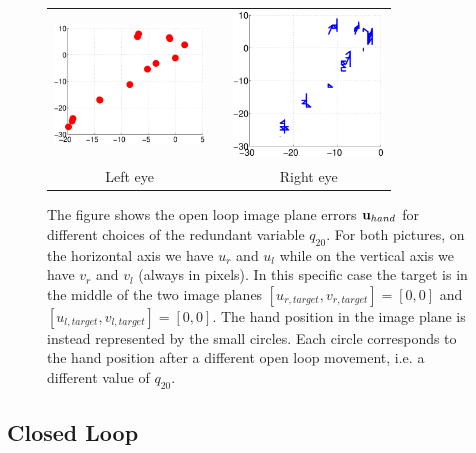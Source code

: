 \begin{figure}
  \begin{center}
	\begin{tabular}{ccc}
	  \parbox{40mm}{\includegraphics[width=40mm]{Figure/LeftEyeOpenLoop.eps}}  & \hspace{2cm} &
	  \parbox{40mm}{\includegraphics[width=40mm]{Figure/RightEyeOpenLoop.eps}}
	  \\
	  \parbox{40mm}{\centering Left eye } & \hspace{2cm} & \parbox{40mm}{\centering Right eye }
  \end{tabular}
\end{center}
\caption{The figure shows the open loop image plane errors $\mathbf{u}_{hand}$ for different
choices of the redundant variable $q_{20}$. For both pictures, on the horizontal axis 
we have $u_r$ and $u_l$ while on the vertical axis we have $v_r$ and $v_l$ (always in pixels).
In this specific case the target is in the middle of the two image planes 
$[u_{r, target}, v_{r, target}] =[0,0]$ and $[u_{l, target}, v_{l, target}]=[0,0]$.
The hand position in the image plane is instead represented 
by the small circles.  Each circle corresponds to the hand position 
after a different open loop movement, i.e. a different value of $q_{20}$.
}\label{Fig:ImagePlaneOpenLoopErrors}
  \end{figure}

\subsection{Closed Loop}

